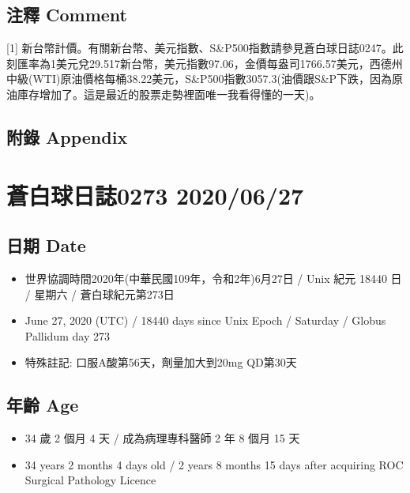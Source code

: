 \documentclass[a5paper, 11pt
]{book}
\providecommand{\tightlist}{%
  \setlength{\itemsep}{0pt}\setlength{\parskip}{0pt}}
\begin{document}
\hypertarget{ux6ce8ux91cb-comment-21}{%
\subsection{注釋 Comment}\label{ux6ce8ux91cb-comment-21}}

{[}1{]}
新台幣計價。有關新台幣、美元指數、S\&P500指數請參見蒼白球日誌0247。此刻匯率為1美元兌29.517新台幣，美元指數97.06，金價每盎司1766.57美元，西德州中級(WTI)原油價格每桶38.22美元，S\&P500指數3057.3(油價跟S\&P下跌，因為原油庫存增加了。這是最近的股票走勢裡面唯一我看得懂的一天)。

\hypertarget{ux9644ux9304-appendix-21}{%
\subsection{附錄 Appendix}\label{ux9644ux9304-appendix-21}}

\hypertarget{ux84bcux767dux7403ux65e5ux8a8c0273-20200627}{%
\section{蒼白球日誌0273
2020/06/27}\label{ux84bcux767dux7403ux65e5ux8a8c0273-20200627}}

\hypertarget{ux65e5ux671f-date-22}{%
\subsection{日期 Date}\label{ux65e5ux671f-date-22}}

\begin{itemize}
\tightlist
\item
  世界協調時間2020年(中華民國109年，令和2年)6月27日 / Unix 紀元 18440 日
  / 星期六 / 蒼白球紀元第273日
\item
  June 27, 2020 (UTC) / 18440 days since Unix Epoch / Saturday / Globus
  Pallidum day 273
\item
  特殊註記: 口服A酸第56天，劑量加大到20mg QD第30天
\end{itemize}

\hypertarget{ux5e74ux9f61-age-22}{%
\subsection{年齡 Age}\label{ux5e74ux9f61-age-22}}

\begin{itemize}
\tightlist
\item
  34 歲 2 個月 4 天 / 成為病理專科醫師 2 年 8 個月 15 天
\item
  34 years 2 months 4 days old / 2 years 8 months 15 days after
  acquiring ROC Surgical Pathology Licence
\end{itemize}
\end{document}
